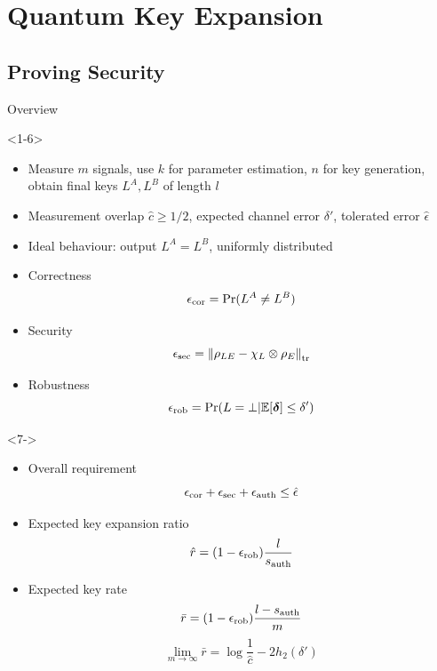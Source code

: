 \documentclass[xcolor=dvipsnames]{beamer}
\newcommand{\?}{\mathrel{?}} %
\newcommand{\norm}[1]{\left\lVert#1\right\rVert} %
\newcommand{\rv}[1]{\boldsymbol{\mathbf{#1}}} %
\newcommand{\tr}{\mathrm{tr}} %
\newcommand{\E}{\mathbb{E}} %
\newcommand{\auth}{\rm auth}
\newcommand{\rob}{\rm rob}
\newcommand{\cor}{\rm cor}
\newcommand{\secur}{\rm sec}
\begin{document}
\section{Quantum Key Expansion}

\subsection{Proving Security}

\begin{frame}{Overview}
  \begin{onlyenv}<1-6>
  \begin{itemize}[<+->]
    \item Measure \(m\) signals, use \(k\) for parameter estimation, \(n\) for key generation, obtain final keys \(L^A, L^B\) of length \(l\)
    \item Measurement overlap \(\hat{c} \geq 1/2\), expected channel error \(\delta'\), tolerated error \(\hat{\epsilon}\)
    \item Ideal behaviour: output \(L^A = L^B\), uniformly distributed
    \item Correctness
      \[ \epsilon_{\cor} = \Pr(L^A \neq L^B) \]
    \item Security
      \[ \epsilon_{\secur} = \norm{\rho_{LE} - \chi_L \otimes \rho_{E}}_{\tr} \]
    \item Robustness
      \[  \epsilon_{\rob} = \Pr(L = \bot | \E[\rv{\delta}] \leq \delta') \]
  \end{itemize}
  \end{onlyenv}

  \begin{onlyenv}<7->
  \begin{itemize}[<+->]
    \item Overall requirement
      \[ \epsilon_{\cor} + \epsilon_{\secur} + \epsilon_{\auth} \leq \hat{\epsilon} \]
    \item Expected key expansion ratio
      \[ \hat{r} = (1-\epsilon_{\rob}) \frac{l}{s_{\auth}} \]
    \item Expected key rate
      \[ \bar{r} = (1-\epsilon_{\rob}) \frac{l - s_{\auth}}{m} \]
      \[ \lim_{m \to \infty} \bar{r} = \log \frac{1}{\hat{c}} - 2h_2(\delta') \]
  \end{itemize}
  \end{onlyenv}
\end{frame}
\end{document}
